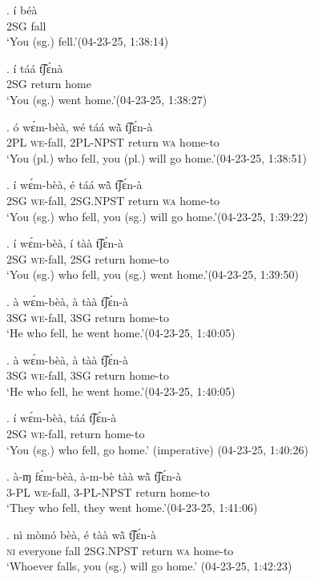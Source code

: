 \documentclass{assets/fieldnotes}
\begin{document}
\exg. í béà\\
\textsc{2SG} fall\\
`You (sg.) fell.’\hfill{(04-23-25, 1:38:14)}

\exg. í táá t͡ʃɛ́nà\\
\textsc{2SG} return home\\
`You (sg.) went home.’\hfill{(04-23-25, 1:38:27)}

\exg. ó wɛ́m-bèà, wé táá wã̀ t͡ʃɛ́n-à\\
\textsc{2PL} \textsc{we}-fall, \textsc{2PL-NPST} return \textsc{wa} home-to\\
`You (pl.) who fell, you (pl.) will go home.’\hfill{(04-23-25, 1:38:51)}\label{you_who_fell}

\exg. í wɛ́m-bèà, é táá wã̀ t͡ʃɛ́n-à\\
\textsc{2SG} \textsc{we}-fall, \textsc{2SG.NPST} return \textsc{wa} home-to\\
`You (sg.) who fell, you (sg.) will go home.’\hfill{(04-23-25, 1:39:22)}

\exg. í wɛ́m-bèà, í tàà t͡ʃɛ́n-à\\
\textsc{2SG} \textsc{we}-fall, \textsc{2SG} return home-to\\
`You (sg.) who fell, you (sg.) went home.’\hfill{(04-23-25, 1:39:50)}

\exg. à wɛ́m-bèà, à tàà t͡ʃɛ́n-à\\
\textsc{3SG} \textsc{we}-fall, \textsc{3SG} return home-to\\
`He who fell, he went home.’\hfill{(04-23-25, 1:40:05)}

\exg. à wɛ́m-bèà, à tàà t͡ʃɛ́n-à\\
\textsc{3SG} \textsc{we}-fall, \textsc{3SG} return home-to\\
`He who fell, he went home.’\hfill{(04-23-25, 1:40:05)}

\exg. í wɛ́m-bèà, táá t͡ʃɛ́n-à\\
\textsc{2SG} \textsc{we}-fall, return home-to\\
`You (sg.) who fell, go home.’ (imperative) \hfill{(04-23-25, 1:40:26)}

\exg. à-ɱ fɛ́m-bèà, à-m-bè tàà wã̀ t͡ʃɛ́n-à\\
\textsc{3-PL} \textsc{we}-fall, \textsc{3-PL-NPST} return home-to\\
`They who fell, they went home.’\hfill{(04-23-25, 1:41:06)}

\noindent{\rule{\textwidth}{1pt}}

\exg. nì mòmó bèà, é tàà wã̀ t͡ʃɛ́n-à\\
\textsc{ni} everyone fall \textsc{2SG.NPST} return \textsc{wa} home-to\\
`Whoever falls, you (sg.) will go home.’ \hfill{(04-23-25, 1:42:23)}
\end{document}
